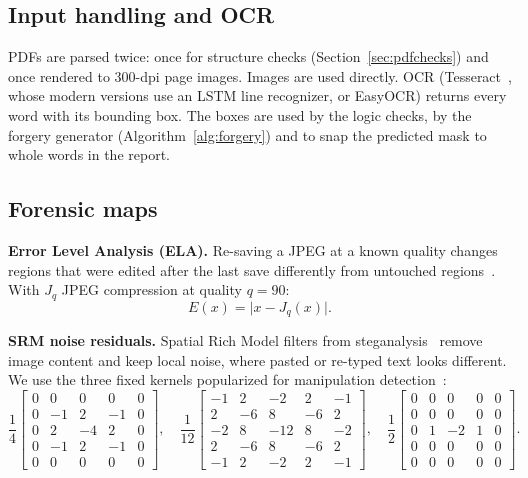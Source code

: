 \documentclass[11pt,a4paper]{article}
\begin{document}
\subsection{Input handling and OCR}
PDFs are parsed twice: once for structure checks (Section~\ref{sec:pdfchecks}) and once rendered
to 300-dpi page images. Images are used directly. OCR (Tesseract~\cite{tesseract}, whose modern
versions use an LSTM line recognizer, or EasyOCR) returns every word with its bounding box. The
boxes are used by the logic checks, by the forgery generator (Algorithm~\ref{alg:forgery}) and to
snap the predicted mask to whole words in the report.

\subsection{Forensic maps}
\textbf{Error Level Analysis (ELA).} Re-saving a JPEG at a known quality changes regions that were
edited after the last save differently from untouched regions~\cite{ela}. With $J_q$ JPEG
compression at quality $q=90$:
\begin{equation}
  E(x)=\bigl\lvert x-J_q(x)\bigr\rvert .
  \label{eq:ela}
\end{equation}

\textbf{SRM noise residuals.} Spatial Rich Model filters from steganalysis~\cite{srm} remove image
content and keep local noise, where pasted or re-typed text looks different. We use the three
fixed kernels popularized for manipulation detection~\cite{rgbn}:
\begin{equation}
  \frac{1}{4}\!\begin{bmatrix}
  0&0&0&0&0\\ 0&-1&2&-1&0\\ 0&2&-4&2&0\\ 0&-1&2&-1&0\\ 0&0&0&0&0
  \end{bmatrix},\quad
  \frac{1}{12}\!\begin{bmatrix}
  -1&2&-2&2&-1\\ 2&-6&8&-6&2\\ -2&8&-12&8&-2\\ 2&-6&8&-6&2\\ -1&2&-2&2&-1
  \end{bmatrix},\quad
  \frac{1}{2}\!\begin{bmatrix}
  0&0&0&0&0\\ 0&0&0&0&0\\ 0&1&-2&1&0\\ 0&0&0&0&0\\ 0&0&0&0&0
  \end{bmatrix}.
  \label{eq:srm}
\end{equation}
\end{document}
